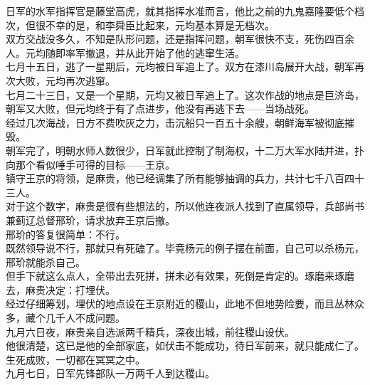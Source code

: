 \begin{multicols}{\theparacolNo}
日军的水军指挥官是藤堂高虎，就其指挥水准而言，他比之前的九鬼嘉隆要低个档次，但很不幸的是，和李舜臣比起来，元均基本算是无档次。\\

双方交战没多久，不知是队形问题，还是指挥问题，朝军很快不支，死伤四百余人。元均随即率军撤退，并从此开始了他的逃窜生活。\\

七月十五日，逃了一星期后，元均被日军追上了。双方在漆川岛展开大战，朝军再次大败，元均再次逃窜。\\

七月二十三日，又是一个星期，元均又被日军追上了。这次作战的地点是巨济岛，朝军又大败，但元均终于有了点进步，他没有再逃下去——当场战死。\\

经过几次海战，日方不费吹灰之力，击沉船只一百五十余艘，朝鲜海军被彻底摧毁。\\

朝军完了，明朝水师人数很少，日军就此控制了制海权，十二万大军水陆并进，扑向那个看似唾手可得的目标——王京。\\

镇守王京的将领，是麻贵，他已经调集了所有能够抽调的兵力，共计七千八百四十三人。\\

对于这个数字，麻贵是很有些想法的，所以他连夜派人找到了直属领导，兵部尚书兼蓟辽总督邢玠，请求放弃王京后撤。\\

邢玠的答复很简单：不行。\\

既然领导说不行，那就只有死磕了。毕竟杨元的例子摆在前面，自己可以杀杨元，邢玠就能杀自己。\\

但手下就这么点人，全带出去死拼，拼未必有效果，死倒是肯定的。琢磨来琢磨去，麻贵决定：打埋伏。\\

经过仔细筹划，埋伏的地点设在王京附近的稷山，此地不但地势险要，而且丛林众多，藏个几千人不成问题。\\

九月六日夜，麻贵亲自选派两千精兵，深夜出城，前往稷山设伏。\\

他很清楚，这已是他的全部家底，如伏击不能成功，待日军前来，就只能成仁了。\\

生死成败，一切都在冥冥之中。\\

九月七日，日军先锋部队一万两千人到达稷山。\\


\end{multicols}
